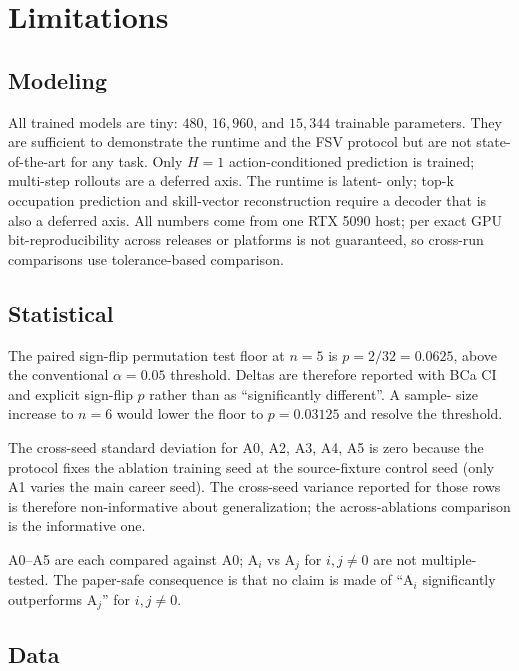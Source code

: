 \documentclass[10pt,twocolumn,letterpaper]{article}
\begin{document}
\section{Limitations}
\label{sec:limits}

\subsection{Modeling}

All trained models are tiny: $480$, $16{,}960$, and $15{,}344$
trainable parameters. They are sufficient to demonstrate the
runtime and the FSV protocol but are not state-of-the-art for any
task. Only $H{=}1$ action-conditioned prediction is trained;
multi-step rollouts are a deferred axis. The runtime is latent-
only; top-k occupation prediction and skill-vector reconstruction
require a decoder that is also a deferred axis. All numbers come
from one RTX 5090 host; per
\cite{pytorch2026reproducibility} exact GPU bit-reproducibility
across releases or platforms is not guaranteed, so cross-run
comparisons use tolerance-based comparison.

\subsection{Statistical}

The paired sign-flip permutation test floor at $n=5$ is
$p = 2/32 = 0.0625$, above the conventional $\alpha=0.05$
threshold. Deltas are therefore reported with BCa CI and explicit
sign-flip $p$ rather than as ``significantly different''. A sample-
size increase to $n=6$ would lower the floor to $p = 0.03125$ and
resolve the threshold.

The cross-seed standard deviation for A0, A2, A3, A4, A5 is zero
because the protocol fixes the ablation training seed at the
source-fixture control seed (only A1 varies the main career
seed). The cross-seed variance reported for those rows is
therefore non-informative about generalization; the
across-ablations comparison is the informative one.

A0--A5 are each compared against A0; A$_i$ vs A$_j$ for
$i,j \neq 0$ are not multiple-tested. The paper-safe consequence
is that no claim is made of ``A$_i$ significantly outperforms
A$_j$'' for $i,j \neq 0$.

\subsection{Data}
\end{document}
